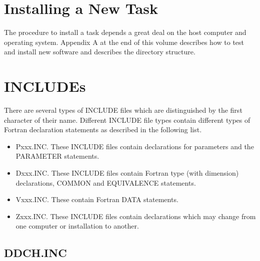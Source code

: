 \section{Installing a New Task}
The procedure to install a task depends a great deal on the host
computer and operating system.  Appendix A at the end of this volume
describes how to test and install new software and describes the
directory structure.

\section{INCLUDEs}
 There are several types of INCLUDE files which are distinguished by
the first character of their name.  Different INCLUDE file types
contain different types of Fortran declaration statements as described
in the following list.
\begin{itemize} %
\item Pxxx.INC.  These INCLUDE files contain declarations for parameters and
the PARAMETER statements.
\item Dxxx.INC.  These INCLUDE files contain Fortran type (with dimension)
declarations, COMMON and EQUIVALENCE statements.
\item Vxxx.INC.  These contain Fortran DATA statements.
\item Zxxx.INC.  These INCLUDE files contain declarations which may change
from one computer or installation to another.
\end{itemize} %
\subsection{DDCH.INC}

